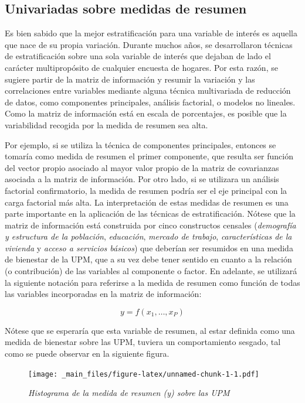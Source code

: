 \documentclass[
  12pt,
  spanish,
]{book}
\begin{document}
\hypertarget{univariadas-sobre-medidas-de-resumen}{%
\subsection{Univariadas sobre medidas de resumen}\label{univariadas-sobre-medidas-de-resumen}}

Es bien sabido que la mejor estratificación para una variable de interés es aquella que nace de su propia variación. Durante muchos años, se desarrollaron técnicas de estratificación sobre una sola variable de interés que dejaban de lado el carácter multipropósito de cualquier encuesta de hogares. Por esta razón, se sugiere partir de la matriz de información y resumir la variación y las correlaciones entre variables mediante alguna técnica multivariada de reducción de datos, como componentes principales, análisis factorial, o modelos no lineales. Como la matriz de información está en escala de porcentajes, es posible que la variabilidad recogida por la medida de resumen sea alta.

Por ejemplo, si se utiliza la técnica de componentes principales, entonces se tomaría como medida de resumen el primer componente, que resulta ser función del vector propio asociado al mayor valor propio de la matriz de covarianzas asociada a la matriz de información. Por otro lado, si se utilizara un análisis factorial confirmatorio, la medida de resumen podría ser el eje principal con la carga factorial más alta. La interpretación de estas medidas de resumen es una parte importante en la aplicación de las técnicas de estratificación. Nótese que la matriz de información está construida por cinco constructos censales (\emph{demografía y estructura de la población}, \emph{educación}, \emph{mercado de trabajo}, \emph{características de la vivienda} y \emph{acceso a servicios básicos}) que deberían ser resumidos en una medida de bienestar de la UPM, que a su vez debe tener sentido en cuanto a la relación (o contribución) de las variables al componente o factor. En adelante, se utilizará la siguiente notación para referirse a la medida de resumen como función de todas las variables incorporadas en la matriz de información:

\[
y = f(x_1,\ldots, x_P)
\]

Nótese que se esperaría que esta variable de resumen, al estar definida como una medida de bienestar sobre las UPM, tuviera un comportamiento sesgado, tal como se puede observar en la siguiente figura.

\begin{figure}
\centering
\texttt{[image: \_main\_files/figure-latex/unnamed-chunk-1-1.pdf]}
\caption{\label{fig:unnamed-chunk-1}\emph{Histograma de la medida de resumen (y) sobre las UPM}}
\end{figure}
\end{document}
